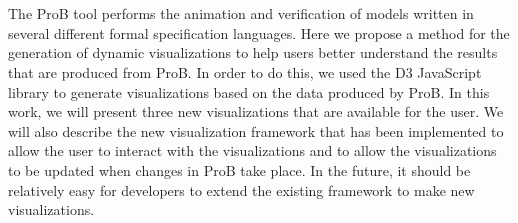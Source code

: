 \section*{}

The ProB tool performs the animation and verification of models written in several different formal specification languages. Here we propose a method for the generation of dynamic visualizations to help users better understand the results that are produced from ProB. In order to do this, we used the D3 JavaScript library to generate visualizations based on the data produced by ProB. In this work, we will present three new visualizations that are available for the user. We will also describe the new visualization framework that has been implemented to allow the user to interact with the visualizations and to allow the visualizations to be updated when changes in ProB take place. In the future, it should be relatively easy for developers to extend the existing framework to make new visualizations.